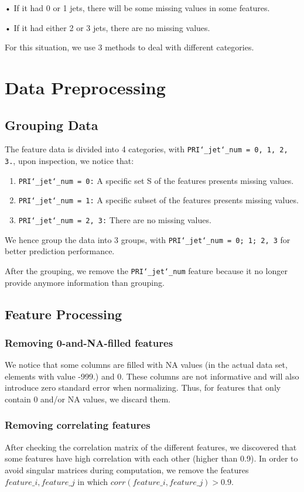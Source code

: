 \documentclass[10pt,conference,compsocconf]{IEEEtran}
\begin{document}
• If it had 0 or 1 jets, there will be some missing values in some features.

• If it had either 2 or 3 jets, there are no missing values.

For this situation, we use 3 methods to deal with different categories. 

\section{Data Preprocessing}
\subsection{Grouping Data}
The feature data is divided into 4 categories, with \texttt{PRI\char`_jet\char`_num = 0, 1, 2, 3.}, upon inspection, we notice that:
\begin{enumerate}
    \item \texttt{PRI\char`_jet\char`_num = 0:} A specific set S of the features presents missing values.
    \item \texttt{PRI\char`_jet\char`_num = 1:} A specific subset of the features presents missing values.
    \item \texttt{PRI\char`_jet\char`_num = 2, 3:} There are no missing values.
\end{enumerate}
\newline
\quad We hence group the data into 3 groups, with \texttt{PRI\char`_jet\char`_num = 0; 1; 2, 3}
for better prediction performance.

After the grouping, we remove the \texttt{PRI\char`_jet\char`_num} feature because it no longer provide anymore information than grouping.


\subsection{Feature Processing}
\subsubsection{Removing 0-and-NA-filled features}
We notice that some columns are filled with NA values (in the actual data set, elements with value -999.) and 0. These columns are not informative and will also introduce zero standard error when normalizing. Thus, for features that only contain 0 and/or NA values, we discard them.

\subsubsection{Removing correlating features}
After checking the correlation matrix of the different features, we discovered that some features have high correlation with each other (higher than 0.9). 
In order to avoid singular matrices during computation, we remove the features $feature\_i, feature\_j$ in which $corr(feature\_i, feature\_j) > 0.9$.
\end{document}
